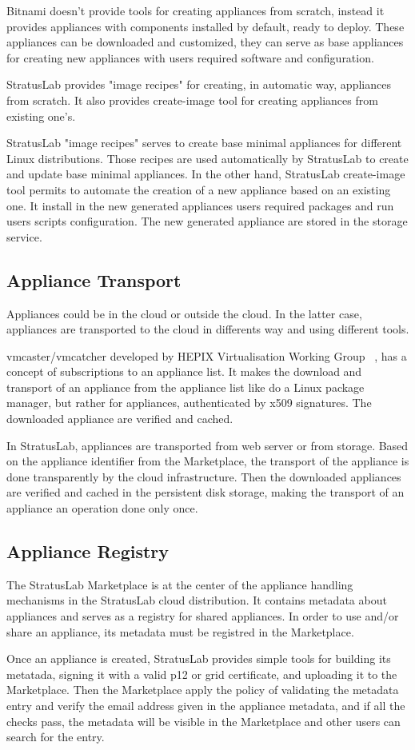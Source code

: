 Bitnami doesn't provide tools for creating appliances from scratch,
instead it provides appliances with components installed by default, ready to deploy.
These appliances can be downloaded and customized, they can serve as 
base appliances for creating new appliances with users required software 
and configuration. 

StratusLab provides "image recipes" for creating, in automatic way, appliances from scratch. 
It also provides create-image tool for creating appliances from existing one's.

StratusLab "image recipes" serves to create base minimal appliances for different
Linux distributions. Those recipes are used automatically by StratusLab to create 
and update base minimal appliances. In the other hand, StratusLab create-image tool 
permits to automate the creation of a new appliance based on an existing one.
It install in the new generated appliances users required packages and run users 
scripts configuration.
The new generated appliance are stored in the storage service.

\subsection{Appliance Transport}

Appliances could be in the cloud or outside the cloud. In the latter case, 
appliances are transported to the cloud in differents way and using different tools.

vmcaster/vmcatcher developed by HEPIX Virtualisation Working
Group ~\cite{hepixbooktransfer}, has a concept of subscriptions to an 
appliance list. It makes the  download and transport of an appliance 
from the appliance list like do a Linux package manager, but rather for
appliances, authenticated by x509 signatures. The downloaded appliance are
verified and cached.

In StratusLab, appliances are transported from web
server or from storage. Based on the appliance identifier from the Marketplace,
the transport of the appliance is done transparently by the cloud infrastructure.
Then the downloaded appliances are verified and cached in the persistent disk storage,
making the transport of an appliance an operation done only once.

\subsection{Appliance Registry}
The StratusLab Marketplace is at the center of the appliance handling
mechanisms in the StratusLab cloud distribution. It contains metadata 
about appliances and serves as a registry for shared appliances. 
In order to use and/or share an appliance, its metadata must be registred 
in the Marketplace. 

Once an appliance is created, StratusLab provides simple tools for 
building its metatada, signing it with a valid p12 or grid
certificate, and uploading it to the Marketplace.  Then the Marketplace
apply the policy of validating the metadata entry and verify the 
email address given in the appliance metadata, and if all the checks pass, 
the metadata will be visible in the Marketplace and other users 
can search for the entry.

